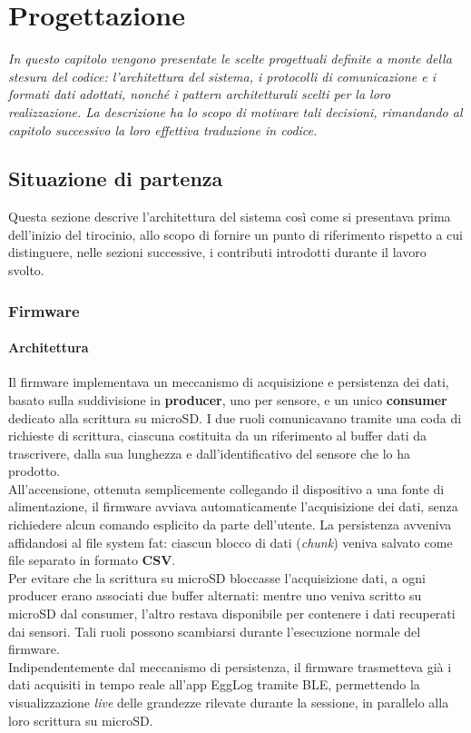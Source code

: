 \chapter{Progettazione}

\textit{In questo capitolo vengono presentate le scelte progettuali definite a monte della stesura del codice:
l'architettura del sistema, i protocolli di comunicazione e i formati dati adottati, nonché i pattern architetturali
scelti per la loro realizzazione. La descrizione ha lo scopo di motivare tali decisioni, rimandando al capitolo
successivo la loro effettiva traduzione in codice.}

\section{Situazione di partenza} \label{sec:situazione-partenza}

Questa sezione descrive l'architettura del sistema così come si presentava prima dell'inizio del tirocinio, allo scopo di fornire un punto
di riferimento rispetto a cui distinguere, nelle sezioni successive, i contributi introdotti durante il lavoro svolto.

\subsection{Firmware}

\subsubsection{Architettura}

Il firmware implementava un meccanismo di acquisizione e persistenza dei dati, basato sulla suddivisione in \textbf{producer}, uno per
sensore, e un unico \textbf{consumer} dedicato alla scrittura su microSD. I due ruoli comunicavano tramite una coda di richieste di scrittura,
ciascuna costituita da un riferimento al buffer dati da trascrivere, dalla sua lunghezza e dall'identificativo del sensore che lo ha prodotto.\\
All'accensione, ottenuta semplicemente collegando il dispositivo a una fonte di alimentazione, il firmware avviava automaticamente l'acquisizione 
dei dati, senza richiedere alcun comando esplicito da parte dell'utente. La persistenza avveniva affidandosi al file system \gls{fat}: ciascun blocco
di dati (\emph{chunk}) veniva salvato come file separato in formato \textbf{CSV}.\\
Per evitare che la scrittura su microSD bloccasse l'acquisizione dati, a ogni producer erano associati due buffer alternati:
mentre uno veniva scritto su microSD dal consumer, l'altro restava disponibile per contenere i dati recuperati dai sensori. Tali
ruoli possono scambiarsi durante l'esecuzione normale del firmware. \\
Indipendentemente dal meccanismo di persistenza, il firmware trasmetteva già i dati acquisiti in tempo reale all'app EggLog tramite BLE,
permettendo la visualizzazione \textit{live} delle grandezze rilevate durante la sessione, in parallelo alla loro scrittura su microSD.

